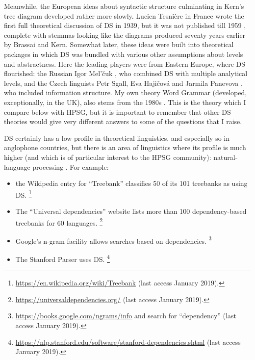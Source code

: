 \documentclass[output=paper
	        ,collection
	        ,collectionchapter
 	        ,biblatex
                ,babelshorthands
                ,newtxmath
                ,draftmode
                ,colorlinks, citecolor=brown
]{langscibook}
\begin{document}
Meanwhile, the European ideas about syntactic structure culminating in Kern’s tree diagram developed rather more slowly. Lucien Tesnière in France wrote the first full theoretical discussion of DS in 1939, but it was not published till 1959 \citep{Tesniere59a-u,Tesniere2015a-u}, complete with stemmas looking like the diagrams produced seventy years earlier by Brassai and Kern. Somewhat later, these ideas were built into theoretical packages in which DS was bundled with various other assumptions about levels and abstractness. Here the leading players were from Eastern Europe, where DS flourished: the Russian Igor Mel’čuk \citep{Melcuk88a-u}, who combined DS with multiple analytical levels, and the Czech linguists Petr Sgall, Eva Hajičová and Jarmila Panevova \citep{Sgall&co1986}, who included information structure. My own theory Word Grammar (developed, exceptionally, in the UK), also stems from the 1980s \citep{Hudson84a-u,Hudson90a-u,Sugayama2002,Hudson2007a-u,Gisborne2008,Rosta2008,Gisborne2010,Hudson2010b-u,Gisborne2011,Duran-Eppler2011,TraugottTrousdale2013,Duran-Eppler&co2016,Hudson2016,Hudson2017,Hudson2018a,Gisborne2019}. This is the theory which I compare below with HPSG, but it is important to remember that other DS theories would give very different answers to some of the questions that I raise.

DS certainly has a low profile in theoretical linguistics, and especially so in anglophone countries, but there is an area of linguistics where its profile is much higher (and which is of particular interest to the HPSG community): natural-language processing \citep{KMcDN2009a-u}. For example:

\begin{itemize}
	\item the Wikipedia entry for ``Treebank'' classifies 50 of its 101 treebanks as using DS.%
	\footnote{\url{https://en.wikipedia.org/wiki/Treebank} (last access January 2019).}%
	
	
	\item The ``Universal dependencies'' website lists more than 100 dependency-based treebanks for 60 languages.%
	\footnote{\url{https://universaldependencies.org/} (last access January 2019).}%
	
	
	\item Google’s n-gram facility allows searches based on dependencies.%
	\footnote{\url{https://books.google.com/ngrams/info} and search for ``dependency'' (last access January 2019).}%
	
	
	\item The Stanford Parser \citep{ChenManning2014,deMarneffe&co2014} uses DS.%
	\footnote{\url{https://nlp.stanford.edu/software/stanford-dependencies.shtml} (last access January 2019).}%
	
\end{itemize}
\end{document}
